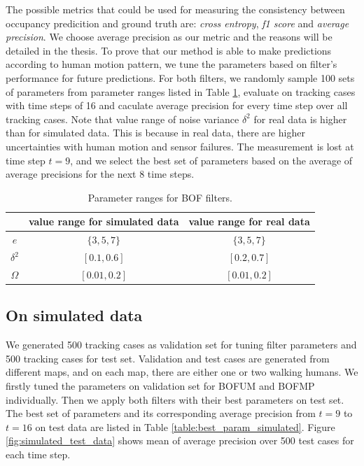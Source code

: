 The possible metrics that could be used for measuring the consistency between occupancy predicition and ground truth are: \textit{cross entropy}, \textit{f1 score} and \textit{average precision}.  We choose average precision as our metric and the reasons will be detailed in the thesis. To prove that our method is able to make predictions according to human motion pattern, we tune the parameters based on filter's performance for future predictions. For both filters, we randomly sample 100 sets of parameters from parameter ranges listed in Table \ref{table:param_range}, evaluate on tracking cases with time steps of 16 and caculate average precision for every time step over all tracking cases. Note that value range of noise variance $\delta^2$ for real data is higher than for simulated data. This is because in real data, there are higher uncertainties with human motion and sensor failures. The measurement is lost at time step \( t=9\), and we select the best set of parameters based on the average of average precisions for the next \( 8 \) time steps. 

\begin{table}[H]
\centering
  \begin{tabular}{c|c|c}
    \hline
     &   value range for simulated data & value range for real data \\ \hline
    \( e \) & \( \{3, 5, 7\} \) &  \( \{3, 5, 7\} \)\\
    \(  \delta^2\) & \( [0.1, 0.6]\) & \( [0.2, 0.7]\) \\   
   \( \Omega \) & \( [0.01, 0.2] \) & \( [0.01, 0.2] \)\\
   \hline
 \end{tabular}
\caption{Parameter ranges for BOF filters.}
\label{table:param_range}
\end{table}

\subsection{On simulated data}

We generated 500 tracking cases as validation set for tuning filter parameters and 500 tracking cases for test set. Validation and test cases are generated from different maps, and on each map, there are either one or two walking humans. We firstly tuned the parameters on validation set for BOFUM and BOFMP individually. Then we apply both filters with their best parameters on test set. The best set of parameters and its corresponding average precision from \( t=9 \) to \( t=16 \) on test data are listed in Table \ref{table:best_param_simulated}. Figure \ref{fig:simulated_test_data} shows mean of average precision over 500 test cases for each time step.

